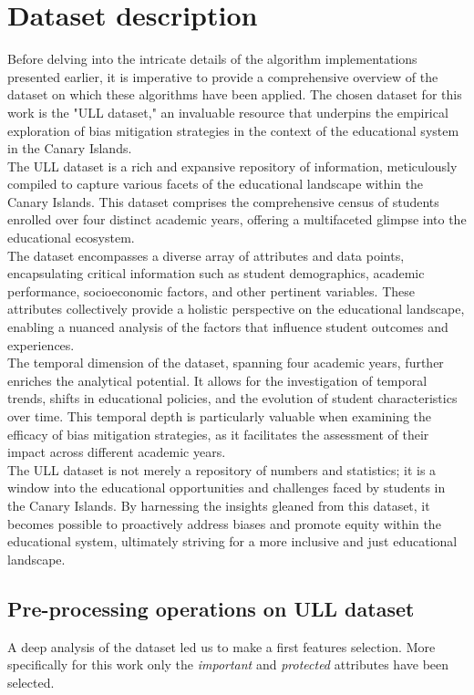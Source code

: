 \documentclass[12pt,a4paper,openright,twoside]{book}
\begin{document}
\section{Dataset description}
Before delving into the intricate details of the algorithm implementations presented earlier, it is imperative to provide a comprehensive overview of the dataset on which these algorithms have been applied. The chosen dataset for this work is the "ULL dataset," an invaluable resource that underpins the empirical exploration of bias mitigation strategies in the context of the educational system in the Canary Islands. \\
The ULL dataset is a rich and expansive repository of information, meticulously compiled to capture various facets of the educational landscape within the Canary Islands. This dataset comprises the comprehensive census of students enrolled over four distinct academic years, offering a multifaceted glimpse into the educational ecosystem. \\
The dataset encompasses a diverse array of attributes and data points, encapsulating critical information such as student demographics, academic performance, socioeconomic factors, and other pertinent variables. These attributes collectively provide a holistic perspective on the educational landscape, enabling a nuanced analysis of the factors that influence student outcomes and experiences. \\
The temporal dimension of the dataset, spanning four academic years, further enriches the analytical potential. It allows for the investigation of temporal trends, shifts in educational policies, and the evolution of student characteristics over time. This temporal depth is particularly valuable when examining the efficacy of bias mitigation strategies, as it facilitates the assessment of their impact across different academic years. \\
The ULL dataset is not merely a repository of numbers and statistics; it is a window into the educational opportunities and challenges faced by students in the Canary Islands. By harnessing the insights gleaned from this dataset, it becomes possible to proactively address biases and promote equity within the educational system, ultimately striving for a more inclusive and just educational landscape.

\subsection{Pre-processing operations on ULL dataset}
A deep analysis of the dataset led us to make a first features selection. More specifically for this work only the \emph{important} and \emph{protected} attributes have been selected.
\end{document}
